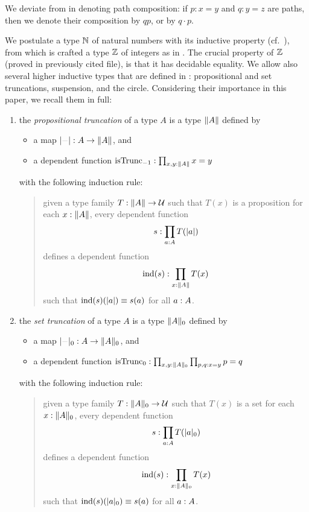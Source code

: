 \documentclass[english,a4paper]{lmcs}
\def\githubpath{\tt\small}
\begin{document}
We deviate from \cite{HoTT} in denoting path composition:
if $p:x=y$ and $q:y=z$ are paths, then we denote their
composition by $qp$, or by $q\cdot p$.

We postulate a type $\mathbb{N}$ of natural numbers with its inductive property
(cf.~\cite[Chapter 1.9]{HoTT}), from which is crafted a type $\mathbb{Z}$ of integers
as in \cite[\githubpath core/lib/types/Int.agda]{hott-agda}. The crucial
property of $\mathbb{Z}$ (proved in previously cited file), is that it has decidable
equality. We allow also several higher inductive types that are defined in
\cite{HoTT}: propositional and set truncations, suspension, and the circle.
Considering their importance in this paper, we recall them in full:
\begin{enumerate}
\item the \emph{propositional truncation} of a type $A$ is a type $\lVert A\rVert$
  defined by
  \begin{itemize}
  \item a map $\trunc \blank \from A \to \Trunc A$, and
  \item a dependent function
    $\mathrm{isTrunc}_{-1} : \prod_{x,y: \lVert A\rVert} x=y$
  \end{itemize}
  with the following induction rule:
  \begin{quote}
    given a type family $T: \lVert A\rVert \to \mathcal{U}$ such that
    $T(x)$ is a proposition for each $x: \lVert A\rVert$, every
    dependent function
    \begin{displaymath}
      s: \prod_{a: A}T(\lvert a\rvert)
    \end{displaymath}
    defines a dependent function
    \begin{displaymath}
      \operatorname{\mathrm{ind}}(s):\prod_{x: \lVert A\rVert} T(x)
    \end{displaymath}
    such that $\operatorname{\mathrm{ind}}(s)(\lvert a\rvert) \equiv s(a)$ for all $a: A$.
  \end{quote}
\item the \emph{set truncation} of a type $A$ is a type $\lVert A\rVert_0$
  defined by
  \begin{itemize}
  \item a map $\settrunc \blank \from A \to \setTrunc A$, and
  \item a dependent function
    $\mathrm{isTrunc}_{0} : \prod_{x,y: \lVert A\rVert_0}\prod_{p,q: x=y} p = q$
  \end{itemize}
  with the following induction rule:
  \begin{quote}
    given a type family $T: \lVert A\rVert_0 \to \mathcal{U}$ such that
    $T(x)$ is a set for each $x: \lVert A\rVert_0$, every
    dependent function
    \begin{displaymath}
      s: \prod_{a: A}T(\lvert a\rvert_0)
    \end{displaymath}
    defines a dependent function
    \begin{displaymath}
      \operatorname{\mathrm{ind}}(s):\prod_{x: \lVert A\rVert_0} T(x)
    \end{displaymath}
    such that $\operatorname{\mathrm{ind}}(s)(\lvert a\rvert_0) \equiv s(a)$ for all $a: A$.
  \end{quote}


\end{enumerate}
\end{document}

